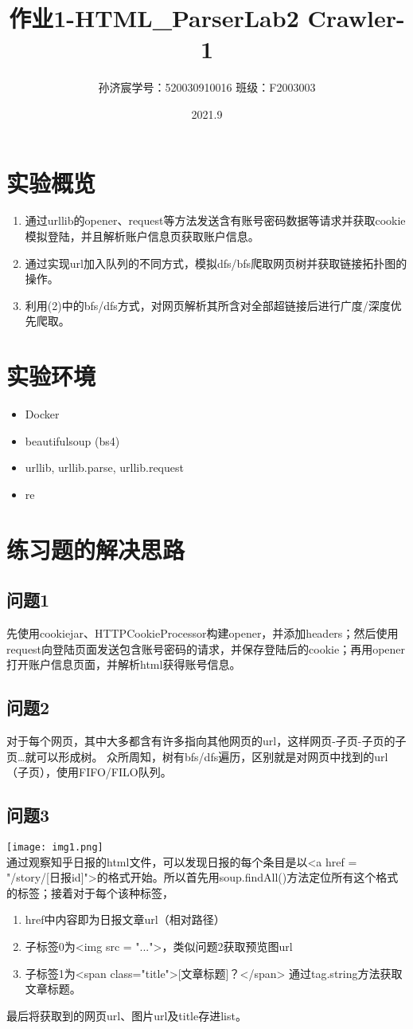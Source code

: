 \documentclass[12pt,a4paper]{article}
\title{作业1-HTML_Parser}
\title{Lab2 \quad Crawler-1}
\date{2021.9}
\author{孙济宸\quad \quad 学号：520030910016 \quad  \quad 班级：F2003003}
\begin{document}
\maketitle
\section{实验概览}
\begin{enumerate}
	\item 通过urllib的opener、request等方法发送含有账号密码数据等请求并获取cookie模拟登陆，并且解析账户信息页获取账户信息。
	\item 通过实现url加入队列的不同方式，模拟dfs/bfs爬取网页树并获取链接拓扑图的操作。
	\item 利用(2)中的bfs/dfs方式，对网页解析其所含对全部超链接后进行广度/深度优先爬取。
\end{enumerate}
\section{实验环境}
\begin{itemize}
	\item Docker
	\item beautifulsoup (bs4)
	\item urllib, urllib.parse, urllib.request
	\item re
\end{itemize}
\section{练习题的解决思路}
\subsection{问题1}
先使用cookiejar、HTTPCookieProcessor构建opener，并添加headers；然后使用request向登陆页面发送包含账号密码的请求，并保存登陆后的cookie；再用opener打开账户信息页面，并解析html获得账号信息。
\subsection{问题2}
对于每个网页，其中大多都含有许多指向其他网页的url，这样网页-子页-子页的子页\dots 就可以形成树。
众所周知，树有bfs/dfs遍历，区别就是对网页中找到的url（子页），使用FIFO/FILO队列。
\subsection{问题3}
\texttt{[image: img1.png]} \\
通过观察知乎日报的html文件，可以发现日报的每个条目是以<a href = "/story/[日报id]">的格式开始。所以首先用soup.findAll()方法定位所有这个格式的标签；接着对于每个该种标签，
\begin{enumerate}
	\item href中内容即为日报文章url（相对路径）
	\item 子标签0为<img src = "...">，类似问题2获取预览图url
	\item 子标签1为<span class="title">[文章标题]？</span> 通过tag.string方法获取文章标题。
\end{enumerate}
最后将获取到的网页url、图片url及title存进list。
\end{document}
